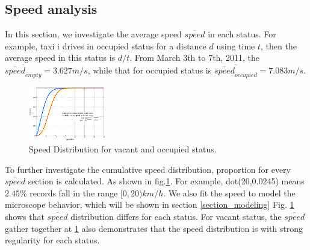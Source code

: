 \subsection{Speed analysis}
In this section, we investigate the average speed $\overline{speed}$ in each status. For example, taxi i drives in occupied status for a distance $d$ using time $t$, then the average speed in this status is $d/t$.
From March 3th to 7th, 2011, the $\overline{\overline{speed}_{empty}} = 3.627 m/s$, while that for occupied status is $\overline{\overline{speed}_{occupied}}=7.083 m/s$.

\begin{figure}[!h]
\centering
\includegraphics[width=0.3\textwidth]{figures_201103/fit/speedfit.eps}
\caption{Speed Distribution for vacant and occupied status.}\label{figure_speed_distribution}
\end{figure}

To further investigate the cumulative speed distribution, proportion for every $\overline{speed}$ section is calculated.
As shown in fig.\ref{figure_speed_distribution}. For example, dot(20,0.0245) means $2.45\%$ records fall in the range $[0,20)km/h$. We also fit the speed to model the microscope behavior, which will be shown in section \ref{section_modeling}
Fig. \ref{figure_speed_distribution} shows that $\overline{speed}$ distribution differs for each status. For vacant status, the $\overline{speed}$ gather together at  \ref{figure_speed_distribution} also demonstrates that the speed distribution is with strong regularity for each status.


